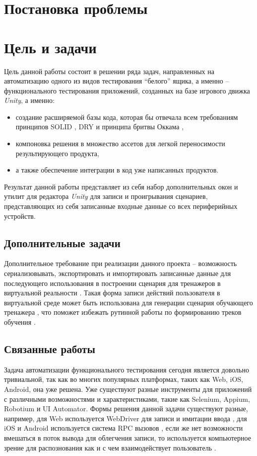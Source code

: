 \Introduction

\section{Постановка проблемы}

\section{Цель и задачи}
Цель данной работы состоит в решении ряда задач, направленных на автоматизацию одного из видов тестирования ``белого'' ящика, а именно -- функционального тестирования приложений, созданных на базе игрового  движка \textit{Unity}, а именно: 
\begin{itemize}
	\item 
	создание расширяемой базы кода, которая бы отвечала всем требованиям принципов SOLID \cite{solid}, DRY \cite{dry} и принципа бритвы Оккама \cite{razor},
	\item
	компоновка решения в множество ассетов для легкой переносимости результирующего продукта, 
	\item а также  обеспечение интеграции в код уже написанных продуктов.
\end{itemize}  Результат данной работы представляет из себя набор дополнительных окон и утилит для редактора \textit{Unity} для записи и проигрывания сценариев, представляющих из себя записанные входные данные со всех периферийных устройств.

\subsection{Дополнительные задачи}
Дополнительное требование при реализации данного проекта -- возможность сериализовывать, экспортировать и импортировать записанные данные для последующего использования в построении сценария для тренажеров в виртуальной реальности \cite{disser}. Такая форма записи действий пользователя в виртуальной среде может быть использована для генерации сценария обучающего тренажера \cite{vr-simulators}, что поможет избежать рутинной работы по формированию треков обучения \cite{visual-editor}.

\subsection{Связанные работы}
Задача автоматизации функционального тестирования сегодня является довольно тривиальной, так как во многих популярных платформах, таких как Web, iOS, Android, она уже решена. Уже существуют разные инструменты для приложений с различными возможностями и характеристиками, такие как Selenium, Appium, Robotium и UI Automator. Формы решения данной задачи существуют разные, например, для Web используется WebDriver для записи и имитации ввода \cite{selenium}, для iOS и Android используется система RPC вызовов \cite{rpc_testing}, если же нет возможности вмешаться в поток вывода для облегчения записи, то используется компьютерное зрение для распознования как и с чем взаимодействует пользователь \cite{appium_opencv}. 

